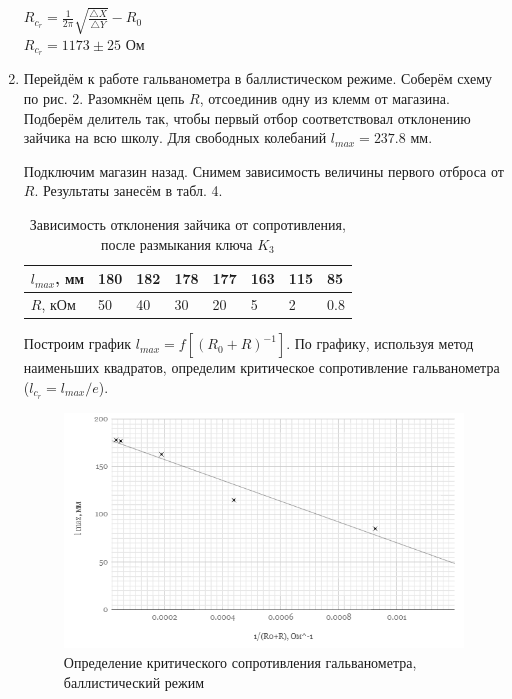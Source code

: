 \documentclass[a4paper]{article}
\begin{document}
\begin{enumerate}
\begin{center}
    $R_c_r = \frac{1}{2\pi}\sqrt{\frac{\triangle X}{\triangle Y}} - R_0$ \\
    $R_c_r = 1173 \pm 25$ Ом
\end{center}

\item Перейдём к работе гальванометра в баллистическом режиме. Соберём схему по рис. 2. Разомкнём цепь $R$, отсоединив одну из клемм от магазина. Подберём делитель так, чтобы первый отбор соответствовал отклонению зайчика на всю школу. Для свободных колебаний $l_{max} = 237.8$ мм. \par
Подключим магазин назад. Снимем зависимость величины первого отброса от $R$. Результаты занесём в табл. 4.


    \begin{table}[h]
    \centering
    \begin{center}
    \caption{Зависимость отклонения зайчика от сопротивления, после размыкания ключа $K_3$}
    \end{center}
    \vspace{0.1cm}
    \label{tab:my_label}
    \begin{tabular}{ |p{1.5cm}||p{1cm}|p{1cm}|p{1cm}|p{1cm}|p{1cm}|p{1cm}|p{1cm}| }
\hline

    $l_{max}$, мм & 180 & 182 & 178 & 177 & 163 & 115 & 85 \\
\hline
    $R$, кОм & 50 & 40 & 30 & 20 & 5 & 2 & 0.8 \\
\hline

    \end{tabular}
\end{table} 

Построим график $l_{max} = f[(R_0 + R)^{-1}]$. По графику, используя метод наименьших квадратов, определим критическое сопротивление гальванометра ($l_c_r = l_{max}/e$).
\begin{figure}[h]
    \centering
    \includegraphics[width=\textwidth]{graph3.PNG}
    \caption{Определение критического сопротивления гальванометра, баллистический режим}
    \label{fig:vac}
\end{figure}


\end{enumerate}
\end{document}

